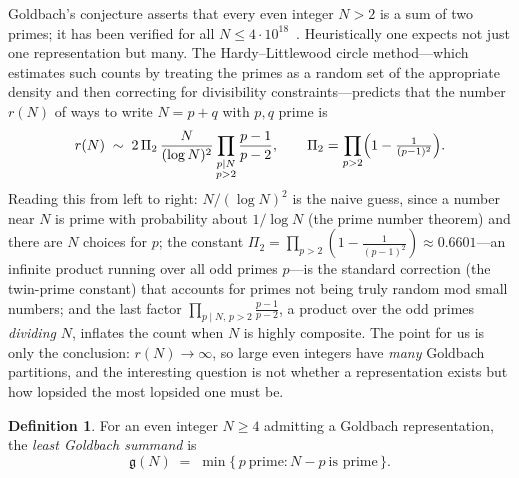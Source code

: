 \documentclass[11pt]{article}
\theoremstyle{plain}
\theoremstyle{definition}
\newtheorem{definition}[theorem]{Definition}
\theoremstyle{remark}
\newcommand{\N}{N}
\newcommand{\g}{\mathfrak{g}}
\begin{document}
Goldbach's conjecture asserts that every even integer $\N>2$ is a sum of two
primes; it has been verified for all $\N\le4\cdot10^{18}$~\cite{OeS}.
Heuristically one expects not just one representation but many. The
Hardy--Littlewood circle method---which estimates such counts by treating the
primes as a random set of the appropriate density and then correcting for
divisibility constraints---predicts that the number $r(\N)$ of ways to write
$\N=p+q$ with $p,q$ prime is
\begin{equation}\label{eq:HL}
r(\N)\;\sim\;2\,\Pi_2\,\frac{\N}{(\log \N)^2}\prod_{\substack{p\mid \N\\ p>2}}\frac{p-1}{p-2},
\qquad
\Pi_2=\prod_{p>2}\Bigl(1-\tfrac{1}{(p-1)^2}\Bigr).
\end{equation}
Reading this from left to right: $\N/(\log \N)^2$ is the naive guess, since a
number near $\N$ is prime with probability about $1/\log \N$ (the prime number
theorem) and there are $\N$ choices for $p$; the constant
$\Pi_2=\prod_{p>2}(1-\tfrac1{(p-1)^2})\approx0.6601$---an infinite product running
over all odd primes $p$---is the standard correction (the twin-prime constant)
that accounts for primes not being truly random mod small numbers; and the last
factor $\prod_{p\mid \N,\,p>2}\frac{p-1}{p-2}$, a product over the odd primes
\emph{dividing} $\N$, inflates the count when $\N$ is highly composite. The point
for us is only the conclusion: $r(\N)\to\infty$, so large even integers have
\emph{many} Goldbach partitions, and the interesting question is not whether a
representation exists but how lopsided the most lopsided one must be.

\begin{definition}
For an even integer $\N\ge4$ admitting a Goldbach representation, the
\emph{least Goldbach summand} is
\[
\g(\N)\;=\;\min\{\,p\ \text{prime}:\N-p\ \text{is prime}\,\}.
\]
\end{definition}
\end{document}

